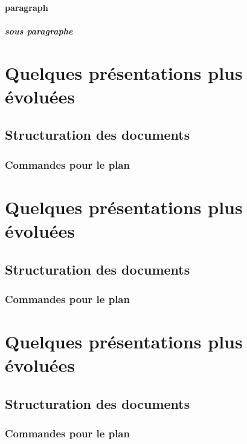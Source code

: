 \documentclass{article}
\begin{document}
\paragraph{paragraph}
\subparagraph{sous paragraphe}

\section{Quelques présentations plus évoluées}
\subsection{Structuration des documents}
\subsubsection{Commandes pour le plan}

\section{Quelques présentations plus évoluées}
\subsection{Structuration des documents}
\subsubsection{Commandes pour le plan}

\section{Quelques présentations plus évoluées}
\subsection{Structuration des documents}
\subsubsection{Commandes pour le plan}

\end{document}
